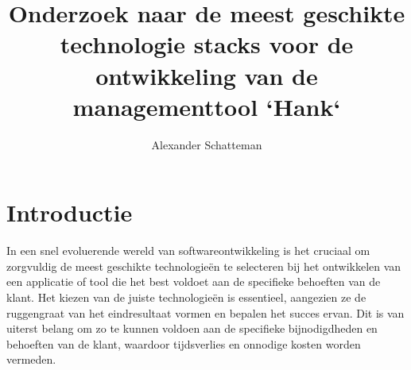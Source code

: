 \documentclass{hogent-article}
\title{Onderzoek naar de meest geschikte technologie stacks voor de ontwikkeling van de managementtool `Hank`}
\author{Alexander Schatteman}
\begin{document}

\tableofcontents
\section{Introductie}%
\label{sec:introductie}
  In een snel evoluerende wereld van softwareontwikkeling is het cruciaal om zorgvuldig de meest geschikte technologieën te selecteren bij het ontwikkelen van een applicatie of tool die het best voldoet aan de specifieke behoeften van de klant.
  Het kiezen van de juiste technologieën is essentieel, aangezien ze de ruggengraat van het eindresultaat vormen en bepalen het succes ervan. Dit is van uiterst belang om zo te kunnen voldoen aan de specifieke bijnodigdheden en behoeften van de klant, waardoor tijdsverlies en onnodige kosten worden vermeden. 
  
\end{document}
